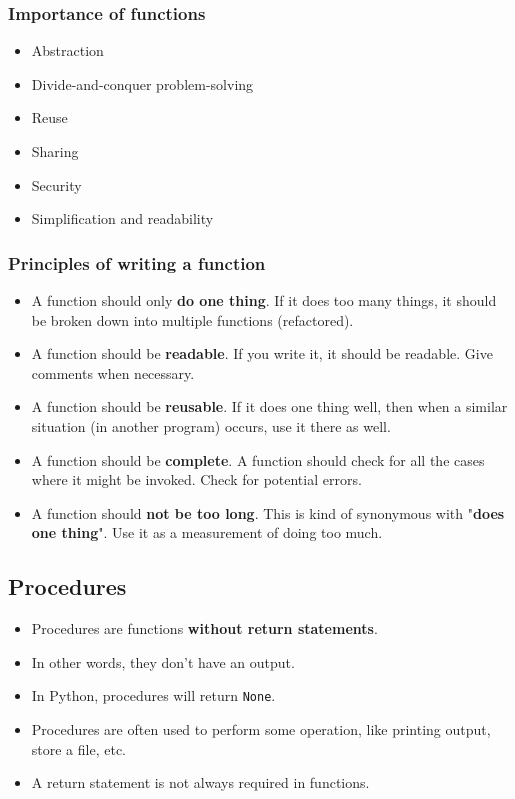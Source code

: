 \documentclass[11pt]{article}
\begin{document}
\subsubsection{Importance of functions}
\label{sec:org7988a6f}
\begin{itemize}
\item Abstraction
\item Divide-and-conquer problem-solving
\item Reuse
\item Sharing
\item Security
\item Simplification and readability
\end{itemize}

\subsubsection{Principles of writing a function}
\label{sec:org9c2d6db}
\begin{itemize}
\item A function should only \textbf{do one thing}. If it does too many things, it should be broken down into multiple functions (refactored).
\item A function should be \textbf{readable}. If you write it, it should be readable. Give comments when necessary.
\item A function should be \textbf{reusable}. If it does one thing well, then when a similar situation (in another program) occurs, use it there as well.
\item A function should be \textbf{complete}. A function should check for all the cases where it might be invoked. Check for potential errors.
\item A function should \textbf{not be too long}. This is kind of synonymous with "\textbf{does one thing}". Use it as a measurement of doing too much.
\end{itemize}

\subsection{Procedures}
\label{sec:org63b3e5a}
\begin{itemize}
\item Procedures are functions \textbf{without return statements}.
\item In other words, they don't have an output.
\item In Python, procedures will return \texttt{None}.
\item Procedures are often used to perform some operation, like printing output, store a file, etc.
\item A return statement is not always required in functions.
\end{itemize}
\end{document}
